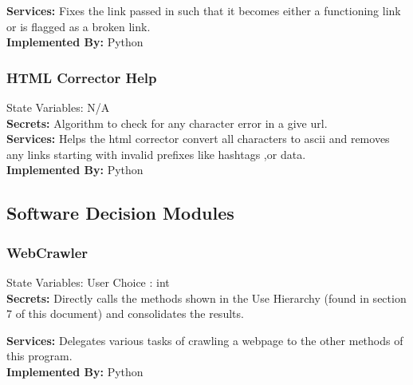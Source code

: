 \documentclass[titlepage]{article}
\begin{document}
{\textbf{Services:}
Fixes the link passed in such that it becomes either a functioning link or is flagged as a broken link.\\

\textbf{Implemented By:}
Python


\subsubsection{HTML Corrector Help}

State Variables: N/A\\

\textbf{Secrets:}
Algorithm to check for any character error in a give url.\\

\textbf{Services:}
 Helps the html corrector convert all characters to ascii and removes any links starting with invalid prefixes like hashtags ,or data.\\

\textbf{Implemented By:}
Python

\subsection{Software Decision Modules}

\subsubsection{WebCrawler}

State Variables: User Choice : int\\

\textbf{Secrets:}
Directly calls the methods shown in the Use Hierarchy (found in section 7 of this document) and consolidates the results.

\textbf{Services:}
Delegates various tasks of crawling a webpage to the other methods of this program.\\

\textbf{Implemented By:}
Python
}
\\
\end{document}
